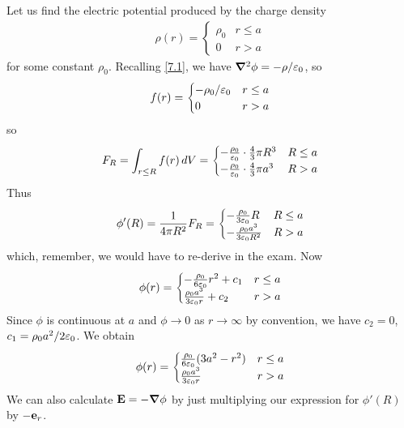 \documentclass{../template/note}
\begin{document}
    \begin{example*}
        Let us find the electric potential produced by the charge density
        \begin{align*}
            \rho(r) = \begin{cases}
                \rho_0 & r \leq a \\
                0 & r > a
            \end{cases}
        \end{align*}
        for some constant \(\rho_0\). Recalling \cref{7.1}, we have \(\grad^2 \phi = -\rho/\eps_0\), so
        \begin{align*}
            f(r) = \begin{cases}
                -\rho_0/\varepsilon_0 & r \leq a \\
                0 & r > a
            \end{cases}
        \end{align*}
        so
        \begin{align*}
            F_R = \int_{r \leq R} f(r) \,d{V} = \begin{cases}
                -\frac{\rho_0}{\varepsilon_0} \cdot \frac 4 3 \pi R^3 & R \leq a \\
                -\frac{\rho_0}{\varepsilon_0} \cdot \frac 4 3 \pi a^3 & R > a
            \end{cases}
        \end{align*}
        Thus
        \begin{align*}
            \phi'(R) = \frac 1{4\pi R^2}F_R = \begin{cases}
                -\frac{\rho_0}{3\varepsilon_0}R & R \leq a \\
                -\frac{\rho_0a^3}{3\varepsilon_0R^2} & R > a
            \end{cases}
        \end{align*}
        which, remember, we would have to re-derive in the exam. Now
        \begin{align*}
            \phi(r) = \begin{cases}
                -\frac{\rho_0}{6\varepsilon_0}r^2 + c_1 & r \leq a \\
                \frac{\rho_0a^3}{3\varepsilon_0r} + c_2 & r > a
            \end{cases}
        \end{align*}
        Since \(\phi\) is continuous at \(a\) and \(\phi \to 0\) as \(r \to \infty\) by convention, we have \(c_2 = 0\), \(c_1 = \rho_0a^2/2\varepsilon_0\). We obtain
        \begin{align*}
            \phi(r) = \begin{cases}
                \frac{\rho_0}{6\varepsilon_0}(3a^2-r^2) & r \leq a \\
                \frac{\rho_0a^3}{3\varepsilon_0r} & r > a
            \end{cases}
        \end{align*}
        We can also calculate \(\V E = -\grad \phi\) by just multiplying our expression for \(\phi'(R)\) by \(-\V e_r\).
    \end{example*}
    
\end{document}
